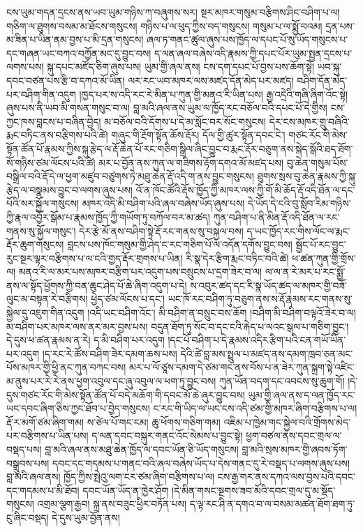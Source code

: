 \documentclass{article}
\begin{document}
ངས་ཡུམ་གདན་དྲངས་ནས་ཡབ་ཡུམ་གཉིས་ཀ་བཞུགས་སར། སྔར་མཁར་གསུམ་བརྩིགས་ཤིང་བཤིག་པ་ལ། གཅིག་ལ་ཐུགས་བསམ་མ་ཐོངས་གསུངས། གཉིས་པ་ལ་ཕུད་ཀྱིས་བད་གསུངས། གསུམ་པ་ལ་སྨྱོ་བའམ། དྲན་པས་མ་ཟིན་པ་ཡིན་ནམ་བྱས་པ་མི་དྲན་གསུངས། ཞལ་ཏ་གནང་ཚུལ་ཞུས་པས་ཁྱོད་ལ་དཔང་པོ་སུ་ཡོད་གསུངས་པ་དང་གཞན་ཡང་བཀའ་བཀྱོན་མང་དུ་བྱུང་བས། ད་ལན་ཞལ་བཞེས་འདི་རྣམས་ཀྱི་དཔང་པོར་ཡུམ་སྤྱན་དྲངས་པ་ལགས་པས། སྐུ་དཔང་མཛོད་ཅིག་ཞུས་པས། ཡུམ་གྱི་ཞལ་ནས། ངས་དག་དཔང་པོ་བྱས་པས་ཆོག་སྟེ། ཡབ་སྐུ་དབང་བཙན་པས་རྩི་བ་དཀའ་མོ་ཡིན། ལར་རང་ཡབ་མཁར་ལས་མཛད་དོན་མེད་པར་མཛད། བཤིག་དོན་མེད་པར་བཤིག་གིན་འདུག །ཁྱད་པར་ས་འདི་རང་རེ་མིན་པ་ཀུན་གྱི་མནའ་རི་ཡིན་པས། རྒྱ་འདྲེའི་གཞི་ཞིག་འོང་སྟེ། ཞུས་པས་ནི་ཡབ་མི་གསན་གསུང་བ་ལ། བླ་མའི་ཞལ་ནས་ཡུམ་ལ་ཁྱོད་རང་བཅོལ་བའི་དཔང་པོ་དེ་གྱིས། ངས་ཀྱང་ཁས་བླངས་པ་བཞིན་བྱེད། མ་བཅོལ་བའི་དོགས་པ་དེ་མ་སློང་བར་སོང་གསུངས། དེར་ངས་མཁར་གྲུ་བཞིའི་རྨང་བཏིང་ནས་བརྩིགས་པའི་ཚེ། གཞུང་གི་རྔོག་སྟོན་ཆོས་རྡོར། དོལ་གྱི་ཚུར་སྟོན་དབང་ངེ་། གཙང་རོང་གི་མེས་སྟོན་ཚོན་པོ་རྣམས་ཀྱིས་སྐུ་རྩེད་ལ་རྡོ་ཆེན་པོ་རང་གཅིག་སྒྲིལ་ཞིང་བྱུང་བ་རྨང་རྡོར་བཅུག་ནས་སྐེད་སྒོའི་ཐད་ཐོག་སོ་གཉིས་ཙམ་ལོངས་པའི་ཚེ། མར་པ་བྱོན་ནས་ཀུན་ལ་གཟིགས་རྟོག་དགའ་མོ་མཛད་པས། བུ་ཆེན་གསུམ་པོས་བསྒྲིལ་བའི་རྡོ་དེ་ལ་ཕྱག་མཛུབ་བཙུགས་ཏེ་མཐུ་ཆེན་རྡོ་འདི་ག་ནས་བྱུང་གསུངས། ཐུགས་སྲས་བུ་ཆེན་རྣམས་ཀྱི་སྐུ་རྩེད་ལ་བསྣམས་བྱུང་བ་ལགས་ཞུས་པས། འོ་ན་ཁོང་ཚོའི་རྡོས་ཁྱོད་ཀྱི་མཁར་ལས་ཀྱི་གོ་མི་ཆོད་རྡོ་འདི་ཐོན་ལ་དང་པོའི་སར་སྐྱོལ་གསུངས། མཁར་འདི་མི་བཤིག་པའི་ཞལ་བཞེས་ཡོད་ཞུས་པས། དེ་ཡོད་དེ་ངའི་བུ་སློབ་རིམ་གཉིས་ཀྱི་རྣལ་འབྱོར་སྒོམ་པ་རྣམས་ཁྱོད་ཀྱི་གཡོག་ཏུ་བཀོལ་བར་མ་ཚད། ཀུན་བཤིག་པ་ནི་མིན་རྡོ་འདི་ཐོན་ལ་རང་གནས་སུ་སྐྱོལ་གསུང་། དེར་རྩེ་མོ་ནས་བཤིག་སྟེ་རྡོ་རང་གནས་སུ་བསྐྱལ་བས། ད་ཡང་ཁྱོད་རང་གིས་ལོང་ལ་རྨང་རྡོར་ཆུག་གསུངས། བླངས་པས་ཁོང་གསུམ་གྱི་ཤེད་ང་རང་གཅིག་པོ་ལ་འདོན་དགོས་བྱུང་བས། སྦྱོང་པོ་རང་བྱུང་རུང་སྔར་ལྟར་བརྩིགས་པ་ལ་ངའི་གྱད་རྡོར་གྲགས་པ་ཡིན། རི་སྣ་དེར་རྩིག་རྨང་བཏིང་བའི་ཚེ། ཕ་ཚན་ཀུན་གྱི་གྲོས་ལ། མནའ་རི་ལ་མར་པས་མཁར་བརྩིག་པར་འདུག་པས་བསྲུངས་པ་དྲག་ཟེར་བ་ལ། ལ་ལ་ན་རེ་མར་པ་རང་སྨྱོ་ནས་ལ་སྟོད་ཕྱོགས་ཀྱི་བན་ཆུང་ཤེད་པོ་ཆེ་ཞིག་འདུག་པ་དེ། ས་འབུར་ཚད་དང་རི་སྣ་ཡོད་ཚད་ལ་མཁར་གྱི་བཟོ་ལུང་མ་བསྟན་རེ་བརྩིགས། ཕྱེད་ཙམ་ལོངས་པ་དང་། ཡང་ཁོ་རང་བཤིག་ཏུ་བཅུག་ནས་ས་རྡོ་རྣམས་རང་གནས་སུ་སྐྱེལ་དུ་འཇུག་གིན་འདུག །འདི་ཡང་བཤིག་འོང་། མི་བཤིག་ན་བསྲུང་བས་ཆོག །བཤིག་མི་བཤིག་བལྟའོ་ཟེར་བ་ལ། མ་བཤིག་པར་མཁར་ལས་ནར་མར་བྱས་པས། བདུན་ཐོག་ཏུ་སོང་བ་དང་ངའི་རྐེད་པ་ལའང་སྒལ་པ་གཅིག་བྱུང་། དེ་དུས་ཕ་ཚན་རྣམས་ན་རེ། ད་མི་བཤིག་པར་འདུག །དང་པོ་བཤིག་པ་དེ་རྣམས་འདིར་རྩིག་པའི་ངན་གཡོ་ཡིན་པར་འདུག །ད་རང་རེ་ཚོས་བཤིག་ཟེར་དམག་ཆས་པས། དེའི་ཚེ་བླ་མས་སྤྲུལ་པ་མཛད་ནས་དམག་ཁྲབ་ཅན་མང་པོས་མཁར་གྱི་ཕྱི་ནང་ཀུན་བཀང་བས། མར་པ་ལོ་ཙཱས་དམག་དེ་ཙམ་གང་ནས་བོས་པ་ན་ཟེར་ཀུན་སྐྲག་སྟེ་འཛིང་མ་ནུས་པར་རེ་རེ་ནས་ཕྱག་འབུལ་དང་ཞུ་འབུལ་ལ་ཕག་ཏུ་བྱུང་བས། ཀུན་ཡོན་བདག་དང་འབངས་སུ་ཆུག་གོ། །དེ་དུས་གཙང་རོང་གི་མེས་སྟོན་ཚོན་པོ་བདེ་མཆོག་གི་དབང་མོ་ཆེ་ཞུར་བྱུང་བས། ཡུམ་གྱི་ཞལ་ནས་ད་ལན་ཁྱོད་རང་ཡང་དབང་ཞིག་ཅིས་ཀྱང་ཐོབ་པ་བྱེད་གསུངས། ང་རང་གི་ཡིད་ལ་ཡང་ངས་འདི་ཙམ་གྱི་མཁར་ཞིག་བརྩིགས་པ་ལ། རྡོ་ར་མགོ་ཙམ་ཞིག་གམ། ས་ཙེལ་པོ་གང་ངམ། ཆུ་ཕོགས་གཅིག་གམ། འཇིམ་པ་ཁྱེམ་གང་སྐྱེལ་བའི་གྲོགས་མེད་པར་བརྩིགས་པ་ཡིན་པས། ད་ལན་དབང་བསྐུར་གནང་འོང་སེམས་པ་བྱུང་སྟེ། ཕྱག་བཙལ་ནས་དབང་གྲལ་ལ་བསྡད་པས། བླ་མའི་ཞལ་ནས་མཐུ་ཆེན་ཁྱོད་ལ་དབང་ཡོན་ཅི་ཡོད་གསུངས། བླ་མའི་སྲས་མཁར་གྱི་ཞབས་ཏོག་བསྒྲུབས་པས། དབང་དང་གདམས་པ་གནང་བའི་ཞལ་བཞེས་ཡོད་པ་དེས་གནང་དུ་རེ་བསྡད་པ་ལགས་ཞུས་པས། བླ་མའི་ཞལ་ནས། ཁྱོད་ཀྱིས་སྤེའུ་ལག་ངར་ཙམ་ཞིག་བརྩིགས་པ་ལ། ངས་རྒྱ་གར་ནས་དཀའ་ལས་བྱས་པའི་དབང་དང་གདམས་པ་མི་ཐོབ། དབང་ཡོན་ཡོད་ན་ཁྱེར་ཤོག །དེ་མིན་གསང་སྔགས་ཟབ་མོའི་དབང་གྲལ་དུ་མ་སྡོད་གསུངས། འགྲམ་ལྕག་རྒྱབ། སྐྲ་ནས་བཟུང་ཕྱིར་བཏོན་པས། ད་ལྟ་རང་ཤི་ན་དགའ་བ་ལ་བསམ་མཚན་ཐོག་ཐག་ཏུ་ངུ་ཞིང་བསྡད། དེ་དུས་ཡུམ་བྱོན་ནས། 
\end{document}
